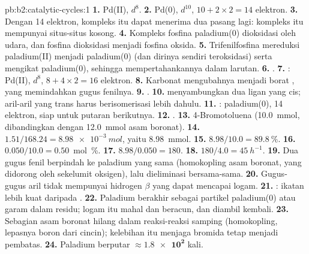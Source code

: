 \begin{solution}{pb:b2:catalytic-cycles:1}
\textbf{1.} Pd(II), $d^8$.
\textbf{2.} Pd(0), $d^{10}$, $10 + 2 \times 2 = 14$ elektron.
\textbf{3.} Dengan 14 elektron, kompleks itu dapat menerima dua pasang lagi:
kompleks itu mempunyai situs-situs kosong.
\textbf{4.} Kompleks fosfina paladium(0) dioksidasi oleh udara, dan fosfina
dioksidasi menjadi fosfina oksida.
\textbf{5.} Trifenilfosfina mereduksi paladium(II) menjadi paladium(0) (dan
dirinya sendiri teroksidasi) serta mengikat paladium(0), sehingga
mempertahankannya dalam larutan.
\textbf{6.} .
\textbf{7.} : Pd(II), $d^8$, $8 + 4 \times 2 =
16$ elektron.
\textbf{8.} Karbonat mengubahnya menjadi borat , yang
memindahkan gugus fenilnya.
\textbf{9.} .
\textbf{10.}  menyambungkan dua ligan yang cis; aril-aril
yang trans harus berisomerisasi lebih dahulu.
\textbf{11.} : paladium(0), 14
elektron, siap untuk putaran berikutnya.
\textbf{12.} .
\textbf{13.} 4-Bromotoluena (\qty{10.0}{mmol}, dibandingkan dengan \qty{12.0}{mmol} asam boronat).
\textbf{14.} $1.51/168.24 = \qty{8.98e-3}{mol}$, yaitu \qty{8.98}{mmol}.
\textbf{15.} $8.98/10.0 = 89.8~\%$.
\textbf{16.} $0.050/10.0 = 0.50$~mol~\%.
\textbf{17.} $8.98/0.050 = 180$.
\textbf{18.} $180/4.0 = \qty{45}{h^{-1}}$.
\textbf{19.} Dua gugus fenil berpindah ke paladium yang sama (homokopling
asam boronat, yang didorong oleh sekelumit oksigen), lalu dieliminasi
bersama-sama.
\textbf{20.} Gugus-gugus aril tidak mempunyai hidrogen $\beta$ yang dapat mencapai logam.
\textbf{21.} : ikatan  lebih kuat daripada .
\textbf{22.} Paladium berakhir sebagai partikel paladium(0) atau garam dalam
residu; logam itu mahal dan beracun, dan diambil kembali.
\textbf{23.} Sebagian asam boronat hilang dalam reaksi-reaksi samping
(homokopling, lepasnya boron dari cincin); kelebihan itu menjaga bromida
tetap menjadi pembatas.
\textbf{24.} Paladium berputar $\boldsymbol{\approx \num{1.8e2}}$ kali.
\end{solution}
